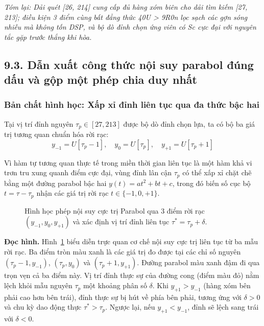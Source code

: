 \textit{Tóm lại: Dải quét [26, 214] cung cấp đủ hàng xóm biên cho dải tìm kiếm [27, 213]; điều kiện 3 điểm cùng bất đẳng thức 40U > 9R0n lọc sạch các gợn sóng nhiễu mà không tốn DSP, và bộ dò đỉnh chọn ứng viên có Sc cực đại với nguyên tắc gặp trước thắng khi hòa.}

\subsection*{9.3. Dẫn xuất công thức nội suy parabol đúng dấu và gộp một phép chia duy nhất}

\subsubsection*{Bản chất hình học: Xấp xỉ đỉnh liên tục qua đa thức bậc hai}
Tại vị trí đỉnh nguyên $\tau_p \in [27, 213]$ được bộ dò đỉnh chọn lựa, ta có bộ ba giá trị tương quan chuẩn hóa rời rạc:
\begin{equation}
y_{-1} = U[\tau_p - 1], \quad y_0 = U[\tau_p], \quad y_{+1} = U[\tau_p + 1]
\end{equation}

Vì hàm tự tương quan thực tế trong miền thời gian liên tục là một hàm khả vi trơn tru xung quanh điểm cực đại, vùng đỉnh lân cận $\tau_p$ có thể xấp xỉ chặt chẽ bằng một đường parabol bậc hai $y(t) = a t^2 + b t + c$, trong đó biến số cục bộ $t = \tau - \tau_p$ nhận các giá trị rời rạc $t \in \{-1, 0, +1\}$.

\begin{figure}[H]
\centering

\caption{Hình học phép nội suy cực trị Parabol qua 3 điểm rời rạc $(y_{-1}, y_0, y_{+1})$ và xác định vị trí đỉnh liên tục $\tau^* = \tau_p + \delta$.}
\label{fig:ch09_parabola_peak}
\end{figure}

\textbf{Đọc hình.} Hình~\ref{fig:ch09_parabola_peak} biểu diễn trực quan cơ chế nội suy cực trị liên tục từ ba mẫu rời rạc. Ba điểm tròn màu xanh là các giá trị đo được tại các chỉ số nguyên $(\tau_p - 1, y_{-1})$, $(\tau_p, y_0)$ và $(\tau_p + 1, y_{+1})$. Đường parabol màu xanh đậm đi qua trọn vẹn cả ba điểm này. Vị trí đỉnh thực sự của đường cong (điểm màu đỏ) nằm lệch khỏi mẫu nguyên $\tau_p$ một khoảng phân số $\delta$. Khi $y_{+1} > y_{-1}$ (hàng xóm bên phải cao hơn bên trái), đỉnh thực sự bị hút về phía bên phải, tương ứng với $\delta > 0$ và chu kỳ dao động thực $\tau^* > \tau_p$. Ngược lại, nếu $y_{+1} < y_{-1}$, đỉnh sẽ lệch sang trái với $\delta < 0$.

